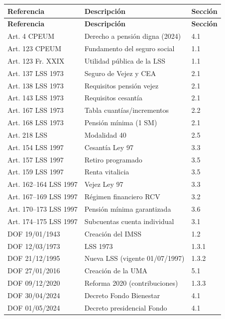 \documentclass[11pt,a4paper]{report}
\begin{document}
\begin{center}
\begin{longtable}{lll}
\toprule
\textbf{Referencia} & \textbf{Descripci\'on} & \textbf{Secci\'on} \\
\midrule
\endfirsthead
\toprule
\textbf{Referencia} & \textbf{Descripci\'on} & \textbf{Secci\'on} \\
\midrule
\endhead
Art. 4 CPEUM & Derecho a pensi\'on digna (2024) & 4.1 \\
Art. 123 CPEUM & Fundamento del seguro social & 1.1 \\
Art. 123 Fr. XXIX & Utilidad p\'ublica de la LSS & 1.1 \\
\midrule
Art. 137 LSS 1973 & Seguro de Vejez y CEA & 2.1 \\
Art. 138 LSS 1973 & Requisitos pensi\'on vejez & 2.1 \\
Art. 143 LSS 1973 & Requisitos cesant\'ia & 2.1 \\
Art. 167 LSS 1973 & Tabla cuant\'ias/incrementos & 2.2 \\
Art. 168 LSS 1973 & Pensi\'on m\'inima (1 SM) & 2.1 \\
Art. 218 LSS & Modalidad 40 & 2.5 \\
\midrule
Art. 154 LSS 1997 & Cesant\'ia Ley 97 & 3.3 \\
Art. 157 LSS 1997 & Retiro programado & 3.5 \\
Art. 159 LSS 1997 & Renta vitalicia & 3.5 \\
Art. 162--164 LSS 1997 & Vejez Ley 97 & 3.3 \\
Art. 167--169 LSS 1997 & R\'egimen financiero RCV & 3.2 \\
Art. 170--173 LSS 1997 & Pensi\'on m\'inima garantizada & 3.6 \\
Art. 174--175 LSS 1997 & Subcuentas cuenta individual & 3.1 \\
\midrule
DOF 19/01/1943 & Creaci\'on del IMSS & 1.2 \\
DOF 12/03/1973 & LSS 1973 & 1.3.1 \\
DOF 21/12/1995 & Nueva LSS (vigente 01/07/1997) & 1.3.2 \\
DOF 27/01/2016 & Creaci\'on de la UMA & 5.1 \\
DOF 09/12/2020 & Reforma 2020 (contribuciones) & 1.3.3 \\
DOF 30/04/2024 & Decreto Fondo Bienestar & 4.1 \\
DOF 01/05/2024 & Decreto presidencial Fondo & 4.1 \\
\bottomrule
\end{longtable}
\end{center}
\end{document}
